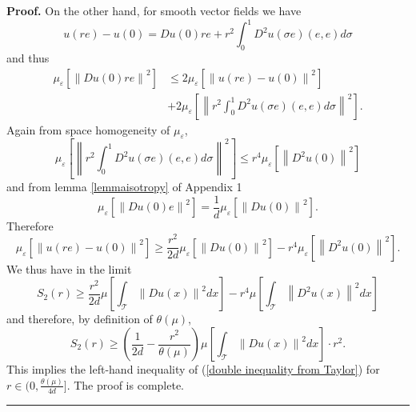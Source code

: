 \documentclass[11pt]{preprint}
\newenvironment{proof}[1][Proof]{\textbf{#1.} }{\ \rule{0.5em}{0.5em}}
\begin{document}
\begin{proof}
On the other hand, for smooth vector fields we have
\[
u\left(  re\right)  -u\left(  0\right)  =Du\left(  0\right)  re+r^{2}\int
_{0}^{1}D^{2}u\left(  \sigma e\right)  \left(  e,e\right)  d\sigma
\]
and thus
\begin{align*}
\mu_{\varepsilon}\left[  \left\|  Du\left(  0\right)  re\right\|
^{2}\right]   &  \leq2\mu_{\varepsilon}\left[  \left\|  u\left(  re\right)
-u\left(  0\right)  \right\|  ^{2}\right]  \\
&  +2\mu_{\varepsilon}\left[  \left\|  r^{2}\int_{0}^{1}D^{2}u\left(  \sigma
e\right)  \left(  e,e\right)  d\sigma\right\|  ^{2}\right]  .
\end{align*}
Again from space homogeneity of $\mu_{\varepsilon}$,
\[
\mu_{\varepsilon}\left[  \left\|  r^{2}\int_{0}^{1}D^{2}u\left(  \sigma
e\right)  \left(  e,e\right)  d\sigma\right\|  ^{2}\right]  \leq r^{4}%
\mu_{\varepsilon}\left[  \left\|  D^{2}u\left(  0\right)  \right\|
^{2}\right]
\]
and from lemma \ref{lemmaisotropy} of Appendix 1
\[
\mu_{\varepsilon}\left[  \left\|  Du\left(  0\right)  e\right\|  ^{2}\right]
=\frac{1}{d}\mu_{\varepsilon}\left[  \left\|  Du\left(  0\right)  \right\|
^{2}\right]  .
\]
Therefore
\[
\mu_{\varepsilon}\left[  \left\|  u\left(  re\right)  -u\left(  0\right)
\right\|  ^{2}\right]  \geq\frac{r^{2}}{2d}\mu_{\varepsilon}\left[  \left\|
Du\left(  0\right)  \right\|  ^{2}\right]  -r^{4}\mu_{\varepsilon}\left[
\left\|  D^{2}u\left(  0\right)  \right\|  ^{2}\right]  .
\]
We thus have in the limit
\[
S_{2}\left(  r\right)  \geq\frac{r^{2}}{2d}\mu\left[  \int_{\mathcal{T}%
}\left\|  Du\left(  x\right)  \right\|  ^{2}dx\right]  -r^{4}\mu\left[
\int_{\mathcal{T}}\left\|  D^{2}u\left(  x\right)  \right\|  ^{2}dx\right]
\]
and therefore, by definition of $\theta\left(  \mu\right)  $,
\[
S_{2}\left(  r\right)  \geq\left(  \frac{1}{2d}-\frac{r^{2}}{\theta\left(
\mu\right)  }\right)  \mu\left[  \int_{\mathcal{T}}\left\|  Du\left(
x\right)  \right\|  ^{2}dx\right]  \cdot r^{2}.
\]
This implies the left-hand inequality of (\ref{double inequality from Taylor})
for $r\in(0,\frac{\theta\left(  \mu\right)  }{4d}]$. The proof is complete.
\end{proof}
\end{document}
